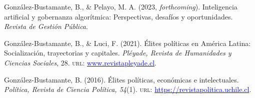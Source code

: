 \begin{publications}

\begin{benumerate}{3}

\item{\small González-Bustamante, B., \& Pelayo, M. A. (2023, {\itshape forthcoming}). Inteligencia artificial y gobernanza algorítmica: Perspectivas, desafíos y oportunidades. {\itshape Revista de Gestión Pública}.}\vspace{1mm}


\item{\small González-Bustamante, B., \& Luci, F. (2021). Élites políticas en América Latina: Socialización, trayectorias y capitales. {\itshape Pléyade, Revista de Humanidades y Ciencias Sociales}, 28. {\scshape url:} \href{http://www.revistapleyade.cl/index.php/OJS/issue/view/30}{\textcolor{blue}{www.revistapleyade.cl}}.}\vspace{1mm}


\item{\small González-Bustamante, B. (2016). Élites políticas, económicas e intelectuales. {\itshape Política, Revista de Ciencia Política, 54}(1). {\scshape url:} \href{https://revistapolitica.uchile.cl/index.php/RP/issue/view/4365}{\textcolor{blue}{https://revistapolitica.uchile.cl}}.}\vspace{1mm}

\end{benumerate}

\end{publications}